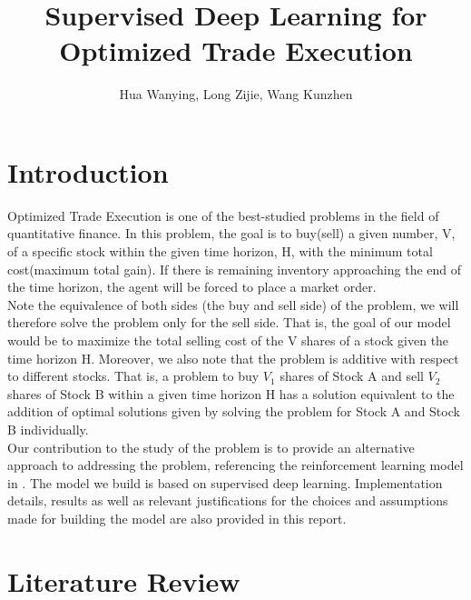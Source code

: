 \documentclass[12pt]{extarticle}
\title{Supervised Deep Learning for Optimized Trade Execution}
\author{Hua Wanying, Long Zijie, Wang Kunzhen}
\begin{document}
\maketitle

\section{Introduction}
Optimized Trade Execution is one of the best-studied problems in the field
of quantitative finance. In this problem, the goal is to buy(sell) a given
number, V, of a specific stock within the given time horizon, H, with the
minimum total cost(maximum total gain). If there is remaining inventory
approaching the end of the time horizon, the agent will be forced to place
a market order. \\


\noindent Note the equivalence of both sides (the buy and sell side) of the
problem, we will therefore solve the problem only for the sell side. That is,
the goal of our model would be to maximize the total selling cost of the
V shares of a stock given the time horizon H. Moreover, we also note that
the problem is additive with respect to different stocks. That is, a problem
to buy $V_1$ shares of Stock A and sell $V_2$ shares of Stock B within a given
time horizon H has a solution equivalent to the addition of optimal solutions given by
solving the problem for Stock A and Stock B individually.\\


\noindent Our contribution to the study of the problem is to provide an alternative
approach to addressing the problem, referencing the reinforcement learning model in
\cite{reinforcement}. The model we build is based on supervised deep learning.
Implementation details, results as well as relevant justifications for the choices
and assumptions made for building the model are also provided in this report.

\section{Literature Review}
\end{document}
